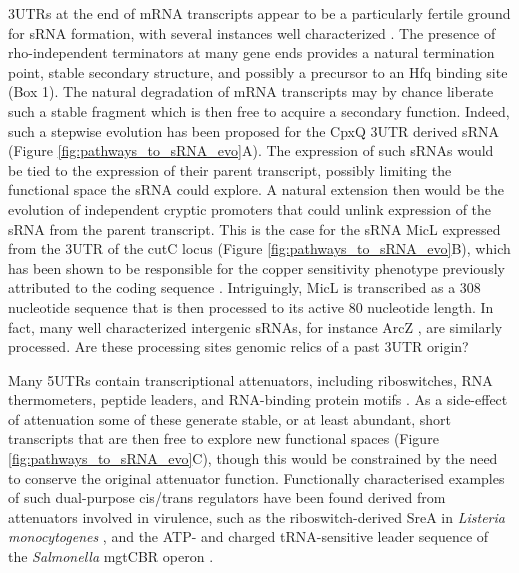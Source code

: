 3\textprime UTRs at the end of mRNA transcripts appear to be a particularly fertile ground for sRNA formation, with several instances well characterized \citep{Miyakoshi2015-gm}. The presence of rho-independent terminators at many gene ends provides a natural termination point, stable secondary structure, and possibly a precursor to an Hfq binding site (Box 1). The natural degradation of mRNA transcripts may by chance liberate such a stable fragment which is then free to acquire a secondary function. Indeed, such a stepwise evolution has been proposed for the CpxQ 3\textprime UTR derived sRNA \citep{Chao2016-df} (Figure \ref{fig:pathways_to_sRNA_evo}A). The expression of such sRNAs would be tied to the expression of their parent transcript, possibly limiting the functional space the sRNA could explore. A natural extension then would be the evolution of independent cryptic promoters that could unlink expression of the sRNA from the parent transcript. This is the case for the sRNA MicL expressed from the 3\textprime UTR of the cutC locus (Figure \ref{fig:pathways_to_sRNA_evo}B), which has been shown to be responsible for the copper sensitivity phenotype previously attributed to the coding sequence \citep{Guo2014-lq}. Intriguingly, MicL is transcribed as a 308 nucleotide sequence that is then processed to its active 80 nucleotide length. In fact, many well characterized intergenic sRNAs, for instance ArcZ \citep{Papenfort2009-tl}, are similarly processed. Are these processing sites genomic relics of a past 3\textprime UTR origin?\par

Many 5\textprime UTRs contain transcriptional attenuators, including riboswitches, RNA thermometers, peptide leaders, and RNA-binding protein motifs \citep{Naville2010-jq}. As a side-effect of attenuation some of these generate stable, or at least abundant, short transcripts that are then free to explore new functional spaces (Figure \ref{fig:pathways_to_sRNA_evo}C), though this would be constrained by the need to conserve the original attenuator function. Functionally characterised examples of such dual-purpose cis/trans regulators have been found derived from attenuators involved in virulence, such as the riboswitch-derived SreA in \textit{Listeria monocytogenes} \citep{Loh2009-is}, and the ATP- and charged tRNA-sensitive leader sequence of the \textit{Salmonella} mgtCBR operon \citep{Choi2017-zn}.\par

